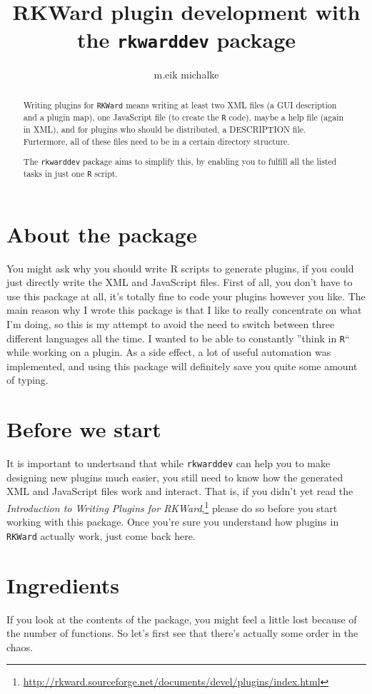 \documentclass[a4paper,10pt]{scrartcl}
\title{RKWard plugin development with the \texttt{rkwarddev} package}
\author{m.eik michalke}
\begin{document}
\maketitle

\begin{abstract}
Writing plugins for \texttt{RKWard} means writing at least two XML files (a GUI description and a plugin map),
one JavaScript file (to create the  \texttt{R} code), maybe a help file (again in XML), and for plugins who
should be distributed, a DESCRIPTION file. Furtermore, all of these files need to be in a certain directory
structure.

The  \texttt{rkwarddev} package aims to simplify this, by enabling you to fulfill all the listed tasks in just
one  \texttt{R} script.
\end{abstract}

\section{About the package}
You might ask why you should write R scripts to generate plugins, if you could just directly write the XML
and JavaScript files. First of all, you don't have to use this package at all, it's totally fine to code your
plugins however you like. The main reason why I wrote this package is that I like to really concentrate on
what I'm doing, so this is my attempt to avoid the need to switch between three different languages all the
time. I wanted to be able to constantly ''think in  \texttt{R}`` while working on a plugin. As a side effect, a
lot of useful automation was implemented, and using this package will definitely save you quite some amount of
typing.

\section{Before we start}
It is important to undertsand that while  \texttt{rkwarddev} can help you to make designing new plugins
much easier, you still need to know how the generated XML and JavaScript files work and interact. That is, if
you didn't yet read the \textit{Introduction to Writing Plugins for
RKWard},\footnote{\url{http://rkward.sourceforge.net/documents/devel/plugins/index.html}} please do so before
you start working with this package. Once you're sure you understand how plugins in  \texttt{RKWard} actually
work, just come back here.

\section{Ingredients}
If you look at the contents of the package, you might feel a little lost because of the number of functions.
So let's first see that there's actually some order in the chaos.
\end{document}
